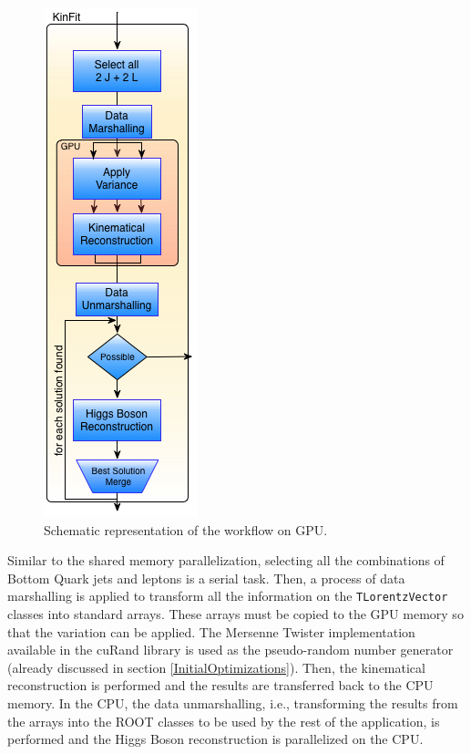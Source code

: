 \begin{figure}[!htp]
	\begin{center}
		\includegraphics[scale=0.5]{../../common/img/gpu_pipeline.png}
		\caption{Schematic representation of the \ttDilepKinFit workflow on GPU.}
		\label{fig:GPUPipeline}
	\end{center}
\end{figure}

Similar to the shared memory parallelization, selecting all the combinations of Bottom Quark jets and leptons is a serial task. Then, a process of data marshalling is applied to transform all the information on the \texttt{TLorentzVector} classes into standard arrays. These arrays must be copied to the GPU memory so that the variation can be applied. The Mersenne Twister implementation available in the \nvidia cuRand library is used as the pseudo-random number generator (already discussed in section \ref{InitialOptimizations}). Then, the kinematical reconstruction is performed and the results are transferred back to the CPU memory. In the CPU, the data unmarshalling, i.e., transforming the results from the arrays into the ROOT classes to be used by the rest of the application, is performed and the Higgs Boson reconstruction is parallelized on the CPU.

